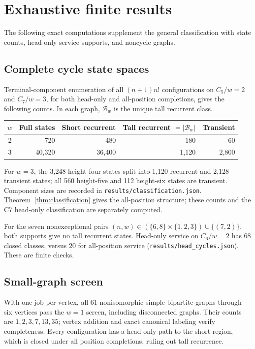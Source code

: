 \documentclass[11pt]{article}
\theoremstyle{remark}
\newcommand{\B}{\mathcal B_w}
\begin{document}
\section{Exhaustive finite results}\label{sec:finite}
The following exact computations supplement the general classification with state counts, head-only service supports, and noncycle graphs.

\subsection{Complete cycle state spaces}
Terminal-component enumeration of all $(n+1)n!$ configurations on $C_5/w=2$ and $C_7/w=3$, for both head-only and all-position completions, gives the following counts. In each graph, $\B$ is the unique tall recurrent class.
\begin{center}
\begin{tabular}{crrrr}
\toprule
$w$ & Full states & Short recurrent & Tall recurrent $=|\B|$ & Transient\\
\midrule
2 & 720 & 480 & 180 & 60\\
3 & 40,320 & 36,400 & 1,120 & 2,800\\
\bottomrule
\end{tabular}
\end{center}
For $w=3$, the 3,248 height-four states split into 1,120 recurrent and 2,128 transient states; all 560 height-five and 112 height-six states are transient. Component sizes are recorded in \texttt{results/classification.json}. Theorem~\ref{thm:classification} gives the all-position structure; these counts and the C7 head-only classification are separately computed.

For the seven nonexceptional pairs $(n,w)\in(\{6,8\}\times\{1,2,3\})\cup\{(7,2)\}$, both supports give no tall recurrent states. Head-only service on $C_6/w=2$ has 68 closed classes, versus 20 for all-position service (\texttt{results/head\_cycles.json}). These are finite checks.

\subsection{Small-graph screen}
With one job per vertex, all 61 nonisomorphic simple bipartite graphs through six vertices pass the $w=1$ screen, including disconnected graphs. Their counts are $1,2,3,7,13,35$; vertex addition and exact canonical labeling verify completeness. Every configuration has a head-only path to the short region, which is closed under all position completions, ruling out tall recurrence.
\end{document}
